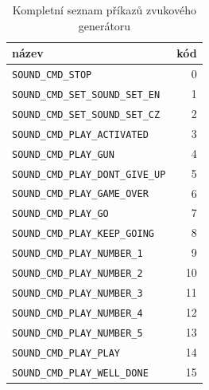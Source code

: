 \begin{table}[H]
  \caption{Kompletní seznam příkazů zvukového generátoru}
  \begin{center}
  	\small
	  \begin{tabular}{|l|r|}
	    \hline
	    \textbf{název} & \textbf{kód} \\\hline\hline
        \texttt{SOUND\_CMD\_STOP}                 &  0 \\\hline
        \texttt{SOUND\_CMD\_SET\_SOUND\_SET\_EN}  &  1 \\\hline
        \texttt{SOUND\_CMD\_SET\_SOUND\_SET\_CZ}  &  2 \\\hline
        \texttt{SOUND\_CMD\_PLAY\_ACTIVATED}      &  3 \\\hline
        \texttt{SOUND\_CMD\_PLAY\_GUN}            &  4 \\\hline
        \texttt{SOUND\_CMD\_PLAY\_DONT\_GIVE\_UP} &  5 \\\hline
        \texttt{SOUND\_CMD\_PLAY\_GAME\_OVER}     &  6 \\\hline
        \texttt{SOUND\_CMD\_PLAY\_GO}             &  7 \\\hline
        \texttt{SOUND\_CMD\_PLAY\_KEEP\_GOING}    &  8 \\\hline
        \texttt{SOUND\_CMD\_PLAY\_NUMBER\_1}      &  9 \\\hline
        \texttt{SOUND\_CMD\_PLAY\_NUMBER\_2}      & 10 \\\hline
        \texttt{SOUND\_CMD\_PLAY\_NUMBER\_3}      & 11 \\\hline
        \texttt{SOUND\_CMD\_PLAY\_NUMBER\_4}      & 12 \\\hline
        \texttt{SOUND\_CMD\_PLAY\_NUMBER\_5}      & 13 \\\hline
        \texttt{SOUND\_CMD\_PLAY\_PLAY}           & 14 \\\hline
        \texttt{SOUND\_CMD\_PLAY\_WELL\_DONE}     & 15 \\\hline
	  \end{tabular}
  \end{center}
\end{table}
